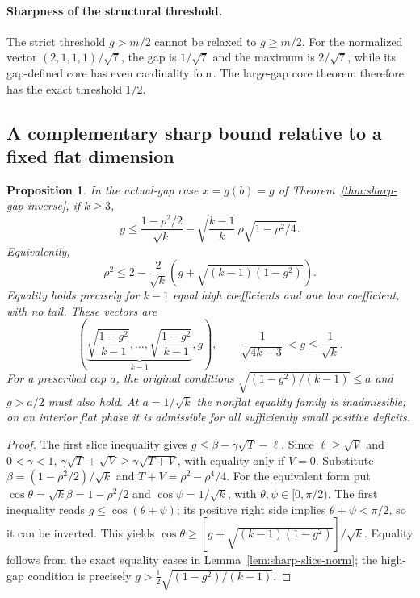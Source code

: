 \documentclass[11pt]{article}
\newtheorem{proposition}[theorem]{Proposition}
\theoremstyle{remark}\newtheorem{remark}[theorem]{Remark}
\begin{document}
\paragraph{Sharpness of the structural threshold.}
The strict threshold $g>m/2$ cannot be relaxed to $g\ge m/2$.
For the normalized vector $(2,1,1,1)/\sqrt7$, the gap is $1/\sqrt7$
and the maximum is $2/\sqrt7$, while its gap-defined core has even
cardinality four. The large-gap core theorem therefore has the exact
threshold $1/2$.

\subsection{A complementary sharp bound relative to a fixed flat dimension}

\begin{proposition}\label{prop:fixed-flat-gap}
In the actual-gap case $x=g(b)=g$ of
Theorem~\ref{thm:sharp-gap-inverse}, if $k\ge3$,
\[
 g\le\frac{1-\rho^2/2}{\sqrt{k}}
       -\sqrt{\frac{k-1}{k}}\,\rho\sqrt{1-\rho^2/4}.
\]
Equivalently,
\[
 \rho^2\le
 2-\frac2{\sqrt{k}}\left(g+\sqrt{(k-1)(1-g^2)}\right).
\]
Equality holds precisely for $k-1$ equal high coefficients and one low
coefficient, with no tail. These vectors are
\[
 \left(\underbrace{\sqrt{\frac{1-g^2}{k-1}},\ldots,
 \sqrt{\frac{1-g^2}{k-1}}}_{k-1},g\right),
 \qquad \frac1{\sqrt{4k-3}}<g\le\frac1{\sqrt{k}}.
\]
For a prescribed cap $a$, the original conditions
$\sqrt{(1-g^2)/(k-1)}\le a$ and $g>a/2$ must also hold.
At $a=1/\sqrt{k}$ the nonflat equality family is inadmissible;
on an interior flat phase it is admissible for all sufficiently small
positive deficits.
\end{proposition}
\begin{proof}
The first slice inequality gives
$g\le\beta-\gamma\sqrt T-\ell$.
Since $\ell\ge\sqrt V$ and $0<\gamma<1$,
$\gamma\sqrt T+\sqrt V\ge\gamma\sqrt{T+V}$, with equality only
if $V=0$. Substitute
$\beta=(1-\rho^2/2)/\sqrt{k}$ and
$T+V=\rho^2-\rho^4/4$.
For the equivalent form put
$\cos\theta=\sqrt{k}\beta=1-\rho^2/2$ and
$\cos\psi=1/\sqrt{k}$, with $\theta,\psi\in[0,\pi/2)$.
The first inequality reads $g\le\cos(\theta+\psi)$; its positive
right side implies $\theta+\psi<\pi/2$, so it can be inverted.
This yields
$\cos\theta\ge[g+\sqrt{(k-1)(1-g^2)}]/\sqrt{k}$.
Equality follows from the exact equality cases in
Lemma~\ref{lem:sharp-slice-norm}; the high-gap condition is precisely
$g>\frac12\sqrt{(1-g^2)/(k-1)}$.
\end{proof}
\end{document}
